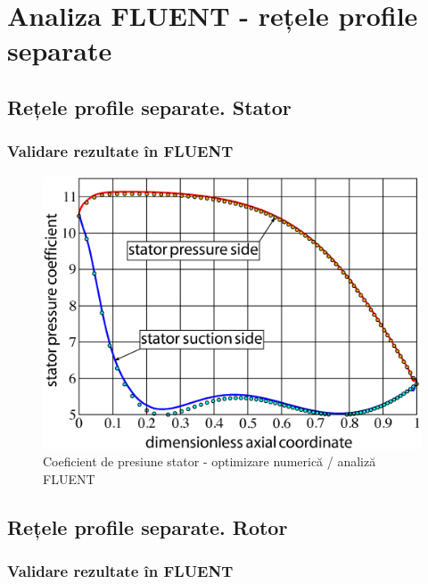 \chapter{Analiza FLUENT - rețele profile separate}\label{chapter:analiza}

\section{Rețele profile separate. Stator}

\subsection{Validare rezultate în FLUENT}

\begin{figure}[h]
	\centering
	\includegraphics[scale=0.5]{figures/cp-stator-ezdraw.eps}
	\caption{Coeficient de presiune stator - optimizare numerică / analiză FLUENT}
	\label{Coeficient de presiune stator - optimizare numerică / analiză FLUENT}
\end{figure}

\clearpage



\section{Rețele profile separate. Rotor}

\subsection{Validare rezultate în FLUENT}

